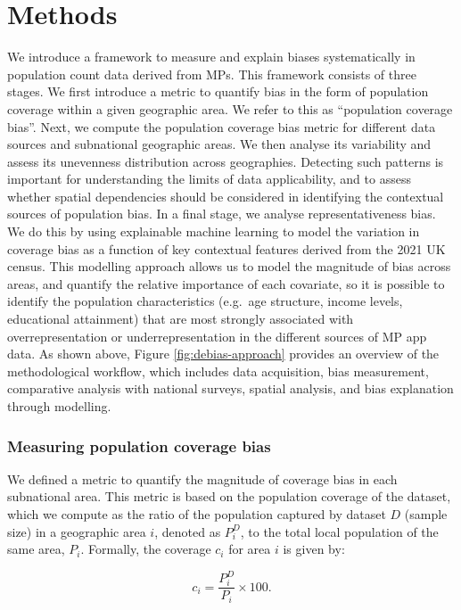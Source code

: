 \documentclass{article}
\begin{document}
\section{Methods}\label{methods}

We introduce a framework to measure and explain biases systematically in
population count data derived from MPs. This framework
consists of three stages. We first introduce a metric to quantify bias
in the form of population coverage within a given geographic area. We
refer to this as ``population coverage bias''. Next, we compute the
population coverage bias metric for different data sources and
subnational geographic areas. We then analyse its variability and assess
its unevenness distribution across geographies. Detecting such patterns
is important for understanding the limits of data applicability, and to
assess whether spatial dependencies should be considered in identifying
the contextual sources of population bias. In a final stage, we analyse
representativeness bias. We do this by using explainable machine
learning to model the variation in coverage bias as a function of key
contextual features derived from the 2021 UK census. This modelling
approach allows us to model the magnitude of bias across areas, and
quantify the relative importance of each covariate, so it is possible to
identify the population characteristics (e.g.~age structure, income
levels, educational attainment) that are most strongly associated with
overrepresentation or underrepresentation in the different sources of MP
app data. As shown above, Figure \ref{fig:debias-approach} provides an overview of the methodological workflow,
which includes data acquisition, bias measurement, comparative analysis
with national surveys, spatial analysis, and bias explanation through
modelling.

\subsubsection{Measuring population coverage bias}\label{measuring-population-coverage-bias}

We defined a metric to quantify the magnitude of coverage bias in each
subnational area. This metric is based on the population coverage of the
dataset, which we compute as the ratio of the population captured by
dataset \(D\) (sample size) in a geographic area \(i\), denoted as \(P_i^D\),
to the total local population of the same area, \(P_i\). Formally, the
coverage \(c_i\) for area \(i\) is given by:

\begin{equation}
c_i = \dfrac{P_i^D}{P_i} \times 100.
\end{equation}
\end{document}
